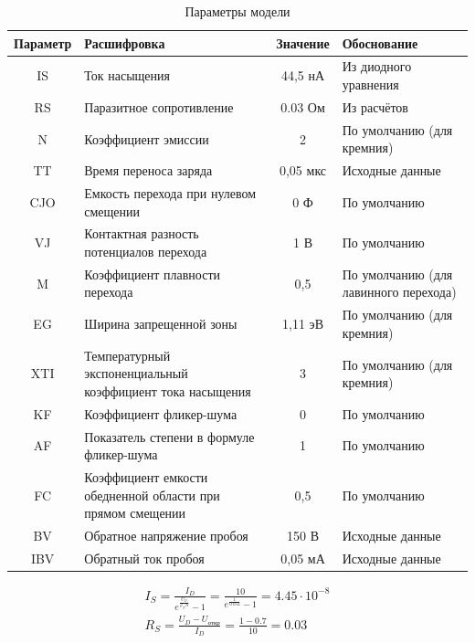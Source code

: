 \documentclass{labreport}
\begin{document}
\begin{table}[h]
    \centering
    \begin{tabularx}{\textwidth}{|c|X|c|X|}
        Параметр & Расшифровка & Значение & Обоснование \\
        \hline
         IS &
Ток насыщения &
44,5 нА &
Из диодного уравнения \\
RS &
Паразитное сопротивление &
0.03 Ом &
Из расчётов \\
N &
Коэффициент эмиссии &
2 &
По умолчанию (для кремния) \\
TT &
Время переноса заряда &
0,05 мкс &

Исходные данные \\
CJO &
Емкость перехода при нулевом смещении &
0 Ф &
По умолчанию \\
VJ &
Контактная разность потенциалов перехода &
1 В &
По умолчанию \\
M &
Коэффициент плавности перехода &
0,5 &
По умолчанию (для лавинного перехода) \\
EG &
Ширина запрещенной зоны &
1,11 эВ &
По умолчанию (для кремния) \\
XTI &
Температурный экспоненциальный коэффициент тока насыщения &
3 &
По умолчанию (для кремния) \\
KF &
Коэффициент фликер-шума &
0 &
По умолчанию \\
AF &
Показатель степени в формуле фликер-шума &
1 &
По умолчанию \\

FC &
Коэффициент емкости обедненной области при прямом смещении &
0,5 &
По умолчанию \\

BV &
Обратное напряжение пробоя &
150 В &
Исходные данные \\
IBV & 
Обратный ток пробоя &
0,05 мА &
Исходные  данные \\



    \end{tabularx}
    \caption{Параметры модели}
    \label{tab:params}
\end{table}



\begin{gather*}
    I_S = \frac{I_D}{e^{\frac{U_D}{\varphi_T N}} - 1} = \frac{10}{e^{\frac{1}{0.052}}-1} = 4.45 \cdot 10^{-8} \\
    R_S = \frac{U_D - U_\text{откр}}{I_D} = \frac{1-0.7}{10} = 0.03
\end{gather*}
\end{document}
